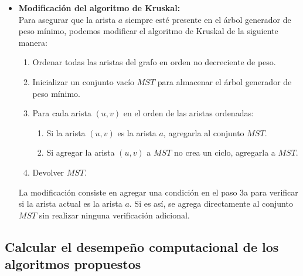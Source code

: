 \begin{itemize}
  \item \textbf{Modificación del algoritmo de Kruskal:}\\
  Para asegurar que la arista $a$ siempre esté presente en el árbol generador de peso mínimo, podemos modificar el algoritmo de Kruskal de la siguiente manera:\\
  \begin{enumerate}
    \item Ordenar todas las aristas del grafo en orden no decreciente de peso.
    \item Inicializar un conjunto vacío $MST$ para almacenar el árbol generador de peso mínimo.
    \item Para cada arista $(u, v)$ en el orden de las aristas ordenadas:
    \begin{enumerate}
      \item Si la arista $(u, v)$ es la arista $a$, agregarla al conjunto $MST$.
      \item Si agregar la arista $(u, v)$ a $MST$ no crea un ciclo, agregarla a $MST$.
    \end{enumerate}
    \item Devolver $MST$.
  \end{enumerate}
  La modificación consiste en agregar una condición en el paso 3a para verificar si la arista actual es la arista $a$. Si es así, se agrega directamente al conjunto $MST$ sin realizar ninguna verificación adicional.
\end{itemize}

\subsection{Calcular el desempeño computacional de los algoritmos propuestos}

